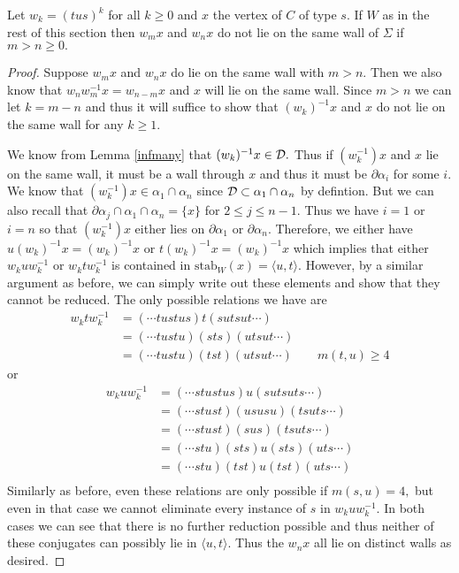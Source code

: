 \documentclass[class=book, crop=false,12 pt]{standalone}
\begin{document}
\begin{lemma}
	\label{samewall}
	Let $w_k=(tus)^k$ for all $k\ge 0$ and $x$ the vertex of $C$ of type $s.$ If $W$ as in the rest of this section then $w_mx$ and $w_nx$ do not lie on the same wall of $\Sigma$ if $m>n\ge 0.$
\end{lemma}
\begin{proof}
	Suppose $w_mx$ and $w_nx$ do lie on the same wall with $m>n.$ Then we also know that $w_nw^{-1}_mx=w_{n-m}x$ and $x$ will lie on the same wall. Since $m>n$ we can let $k=m-n$ and thus it will suffice to show that $(w_k)^{-1}x$ and $x$ do not lie on the same wall for any $k\ge 1.$
	
We know from Lemma \ref{infmany} that $(w_k)^{-1}x\in \mathcal{D}.$ Thus if $(w_k^{-1})x$ and $x$ lie on the same wall, it must be a wall through $x$ and thus it must be $\partial\alpha_i$ for some $i.$ We know that $(w_k^{-1})x\in \alpha_1\cap \alpha_n$ since $\mathcal{D}\subset \alpha_1\cap \alpha_n$ by defintion. But we can also recall that $\partial\alpha_j\cap \alpha_1\cap \alpha_n=\{x\}$ for $2\le j\le n-1.$ Thus we have $i=1$ or $i=n$ so that $(w_k^{-1})x$ either lies on $\partial\alpha_1$ or $\partial\alpha_n.$  Therefore, we either have $u(w_k)^{-1}x=(w_k)^{-1}x$ or $t(w_k)^{-1}x=(w_k)^{-1}x$ which implies that either $w_kuw_k^{-1}$ or $w_ktw_k^{-1}$ is contained in $\mathrm{stab}_W(x)=\langle u,t \rangle.$ However, by a similar argument as before, we can simply write out these elements and show that they cannot be reduced. The only possible relations we have are
\begin{align*}
	w_ktw_k^{-1}&=(\cdots tustus)t(sutsut\cdots)\\
		    &=(\cdots tustu)(sts)(utsut\cdots)\\
		    &=(\cdots tustu)(tst)(utsut\cdots)\qquad m(t,u)\ge 4
\end{align*}
or
\begin{align*}
	w_kuw_k^{-1}&=(\cdots stustus)u(sutsuts\cdots)\\
		    &=(\cdots stust)(ususu)(tsuts\cdots)\\
		    &=(\cdots stust)(sus)(tsuts\cdots)\\
		    &=(\cdots stu)(sts)u(sts)(uts\cdots)\\
		    &=(\cdots stu)(tst)u(tst)(uts\cdots)\\
\end{align*}
Similarly as before, even these relations are only possible if $m(s,u)=4,$ but even in that case we cannot eliminate every instance of $s$ in $w_kuw_k^{-1}.$ In both cases we can see that there is no further reduction possible and thus neither of these conjugates can possibly lie in $\langle u,t \rangle.$ Thus the $w_nx$ all lie on distinct walls as desired.
\end{proof}
\end{document}
